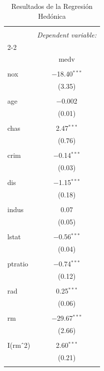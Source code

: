 
\begin{table}[!htbp] \centering 
  \caption{Resultados de la Regresión Hedónica} 
  \label{} 
\begin{tabular}{@{\extracolsep{5pt}}lc} 
\\[-1.8ex]\hline 
\hline \\[-1.8ex] 
 & \multicolumn{1}{c}{\textit{Dependent variable:}} \\ 
\cline{2-2} 
\\[-1.8ex] & medv \\ 
\hline \\[-1.8ex] 
 nox & $-$18.40$^{***}$ \\ 
  & (3.35) \\ 
  & \\ 
 age & $-$0.002 \\ 
  & (0.01) \\ 
  & \\ 
 chas & 2.47$^{***}$ \\ 
  & (0.76) \\ 
  & \\ 
 crim & $-$0.14$^{***}$ \\ 
  & (0.03) \\ 
  & \\ 
 dis & $-$1.15$^{***}$ \\ 
  & (0.18) \\ 
  & \\ 
 indus & 0.07 \\ 
  & (0.05) \\ 
  & \\ 
 lstat & $-$0.56$^{***}$ \\ 
  & (0.04) \\ 
  & \\ 
 ptratio & $-$0.74$^{***}$ \\ 
  & (0.12) \\ 
  & \\ 
 rad & 0.25$^{***}$ \\ 
  & (0.06) \\ 
  & \\ 
 rm & $-$29.67$^{***}$ \\ 
  & (2.66) \\ 
  & \\ 
 I(rm$\hat{\mkern6mu}$2) & 2.60$^{***}$ \\ 
  & (0.21) \\ 
  & \\ 

\end{tabular}
\end{table}
